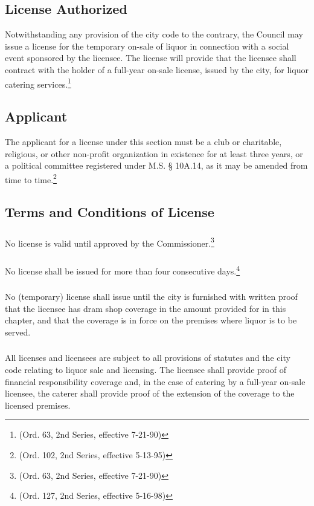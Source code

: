 \subsection{License Authorized}
Notwithstanding any provision of the city code to the contrary, the Council may issue a license for the temporary on-sale of liquor in connection with a social event sponsored by the licensee.  The license will provide that the licensee shall contract with the holder of a full-year on-sale license, issued by the city, for liquor catering services.\footnote{(Ord. 63, 2nd Series, effective 7-21-90)}
\subsection{Applicant}
The applicant for a license under this section must be a club or charitable, religious, or other non-profit organization in existence for at least three years, or a political committee registered under M.S. § 10A.14, as it may be amended from time to time.\footnote{(Ord. 102, 2nd Series, effective 5-13-95)}
\subsection{Terms and Conditions of License}
\subsubsection{}
No license is valid until approved by the Commissioner.\footnote{(Ord. 63, 2nd Series, effective 7-21-90)}
\subsubsection{}
No license shall be issued for more than four consecutive days.\footnote{(Ord. 127, 2nd Series, effective 5-16-98)}
\subsubsection{}
No (temporary) license shall issue until the city is furnished with written proof that the licensee has dram shop coverage in the amount provided for in this chapter, and that the coverage is in force on the premises where liquor is to be served.
\subsubsection{}
All licenses and licensees are subject to all provisions of statutes and the city code relating to liquor sale and licensing.  The licensee shall provide proof of financial responsibility coverage and, in the case of catering by a full-year on-sale licensee, the caterer shall provide proof of the extension of the coverage to the licensed premises.
